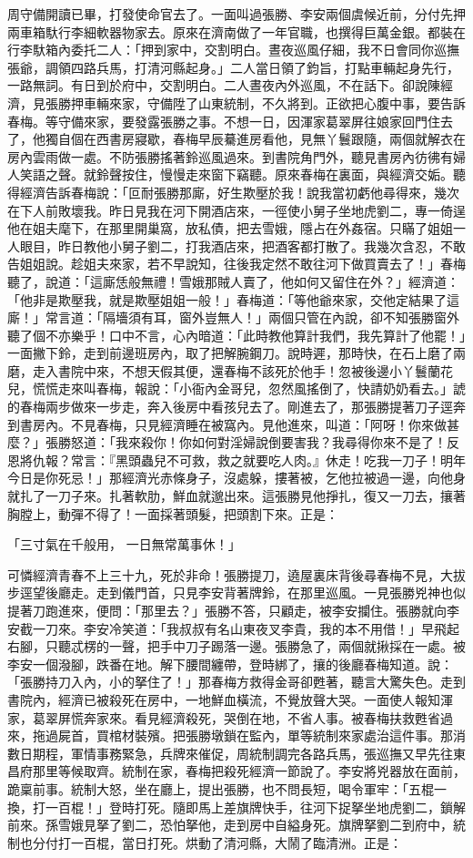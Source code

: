 周守備開讀已畢，打發使命官去了。一面叫過張勝、李安兩個虞候近前，分付先押兩車箱馱行李細軟器物家去。原來在濟南做了一年官職，也撰得巨萬金銀。都裝在行李馱箱內委托二人：「押到家中，交割明白。晝夜巡風仔細，我不日會同你巡撫張爺，調領四路兵馬，打清河縣起身。」二人當日領了鈞旨，打點車輛起身先行，一路無詞。有日到於府中，交割明白。二人晝夜內外巡風，不在話下。卻說陳經濟，見張勝押車輛來家，守備陞了山東統制，不久將到。正欲把心腹中事，要告訴春梅。等守備來家，要發露張勝之事。不想一日，因渾家葛翠屏往娘家回門住去了，他獨自個在西書房寢歇，春梅早辰驀進房看他，見無丫鬟跟隨，兩個就解衣在房內雲雨做一處。不防張勝搖著鈴巡風過來。到書院角門外，聽見書房內彷彿有婦人笑語之聲。就鈴聲按住，慢慢走來窗下竊聽。原來春梅在裏面，與經濟交姤。聽得經濟告訴春梅說：「叵耐張勝那廝，好生欺壓於我！說我當初虧他尋得來，幾次在下人前敗壞我。昨日見我在河下開酒店來，一徑使小舅子坐地虎劉二，專一倚逞他在姐夫麾下，在那里開巢窩，放私債，把去雪娥，隱占在外姦宿。只瞞了姐姐一人眼目，昨日教他小舅子劉二，打我酒店來，把酒客都打散了。我幾次含忍，不敢告姐姐說。趁姐夫來家，若不早說知，往後我定然不敢往河下做買賣去了！」春梅聽了，說道：「這廝恁般無禮！雪娥那賊人賣了，他如何又留住在外？」經濟道：「他非是欺壓我，就是欺壓姐姐一般！」春梅道：「等他爺來家，交他定結果了這廝！」常言道：「隔墻須有耳，窗外豈無人！」兩個只管在內說，卻不知張勝窗外聽了個不亦樂乎！口中不言，心內暗道：「此時教他算計我們，我先算計了他罷！」一面撇下鈴，走到前邊班房內，取了把解腕鋼刀。說時遲，那時快，在石上磨了兩磨，走入書院中來，不想天假其便，還春梅不該死於他手！忽被後邊小丫鬟蘭花兒，慌慌走來叫春梅，報說：「小衙內金哥兒，忽然風搖倒了，快請奶奶看去。」諕的春梅兩步做來一步走，奔入後房中看孩兒去了。剛進去了，那張勝提著刀子逕奔到書房內。不見春梅，只見經濟睡在被窩內。見他進來，叫道：「阿呀！你來做甚麼？」張勝怒道：「我來殺你！你如何對淫婦說倒要害我？我尋得你來不是了！反恩將仇報？常言：『黑頭蟲兒不可救，救之就要吃人肉。』休走！吃我一刀子！明年今日是你死忌！」那經濟光赤條身子，沒處躲，摟著被，乞他拉被過一邊，向他身就扎了一刀子來。扎著軟肋，鮮血就邈出來。這張勝見他掙扎，復又一刀去，攘著胸膛上，動彈不得了！一面採著頭髮，把頭割下來。正是：

「三寸氣在千般用，  一日無常萬事休！」

可憐經濟青春不上三十九，死於非命！張勝提刀，遶屋裏床背後尋春梅不見，大拔步逕望後廳走。走到儀門首，只見李安背著牌鈴，在那里巡風。一見張勝兇神也似提著刀跑進來，便問：「那里去？」張勝不答，只顧走，被李安攔住。張勝就向李安截一刀來。李安冷笑道：「我叔叔有名山東夜叉李貴，我的本不用借！」早飛起右腳，只聽忒楞的一聲，把手中刀子踢落一邊。張勝急了，兩個就揪採在一處。被李安一個潑腳，跌番在地。解下腰間纏帶，登時綁了，攘的後廳春梅知道。說：「張勝持刀入內，小的拏住了！」那春梅方救得金哥卻甦著，聽言大驚失色。走到書院內，經濟已被殺死在房中，一地鮮血橫流，不覺放聲大哭。一面使人報知渾家，葛翠屏慌奔家來。看見經濟殺死，哭倒在地，不省人事。被春梅扶救甦省過來，拖過屍首，買棺材裝殯。把張勝墩鎖在監內，單等統制來家處治這件事。那消數日期程，軍情事務緊急，兵牌來催促，周統制調完各路兵馬，張巡撫又早先往東昌府那里等候取齊。統制在家，春梅把殺死經濟一節說了。李安將兇器放在面前，跪稟前事。統制大怒，坐在廳上，提出張勝，也不問長短，喝令軍牢：「五棍一換，打一百棍！」登時打死。隨即馬上差旗牌快手，往河下捉拏坐地虎劉二，鎖解前來。孫雪娥見拏了劉二，恐怕拏他，走到房中自縊身死。旗牌拏劉二到府中，統制也分付打一百棍，當日打死。烘動了清河縣，大鬧了臨清洲。正是：

